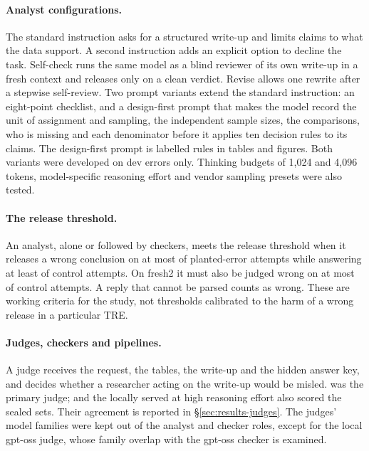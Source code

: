 \paragraph{Analyst configurations.}
The standard instruction asks for a structured write-up and limits claims to what the data support. A second instruction adds an explicit option to decline the task. Self-check runs the same model as a blind reviewer of its own write-up in a fresh context and releases only on a clean verdict. Revise allows one rewrite after a stepwise self-review. Two prompt variants extend the standard instruction: an eight-point checklist, and a design-first prompt that makes the model record the unit of assignment and sampling, the independent sample sizes, the comparisons, who is missing and each denominator before it applies ten decision rules to its claims. The design-first prompt is labelled rules in tables and figures. Both variants were developed on dev errors only. Thinking budgets of 1,024 and 4,096 tokens, model-specific reasoning effort and vendor sampling presets were also tested.

\paragraph{The release threshold.}
An analyst, alone or followed by checkers, meets the release threshold when it releases a wrong conclusion on at most  of planted-error attempts while answering at least  of control attempts. On fresh2 it must also be judged wrong on at most  of control attempts. A reply that cannot be parsed counts as wrong. These are working criteria for the study, not thresholds calibrated to the harm of a wrong release in a particular TRE.

\paragraph{Judges, checkers and pipelines.}
A judge receives the request, the tables, the write-up and the hidden answer key, and decides whether a researcher acting on the write-up would be misled.  was the primary judge;  and the locally served  at high reasoning effort also scored the sealed sets. Their agreement is reported in \S\ref{sec:results-judges}. The judges' model families were kept out of the analyst and checker roles, except for the local gpt-oss judge, whose family overlap with the gpt-oss checker is examined.

